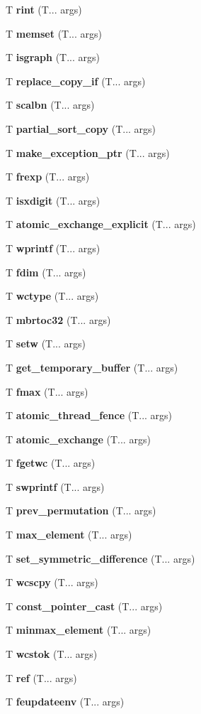 \begin{DoxyCompactItemize}
\item 
T \textbf{ rint} (T... args)
\item 
T \textbf{ memset} (T... args)
\item 
T \textbf{ isgraph} (T... args)
\item 
T \textbf{ replace\+\_\+copy\+\_\+if} (T... args)
\item 
T \textbf{ scalbn} (T... args)
\item 
T \textbf{ partial\+\_\+sort\+\_\+copy} (T... args)
\item 
T \textbf{ make\+\_\+exception\+\_\+ptr} (T... args)
\item 
T \textbf{ frexp} (T... args)
\item 
T \textbf{ isxdigit} (T... args)
\item 
T \textbf{ atomic\+\_\+exchange\+\_\+explicit} (T... args)
\item 
T \textbf{ wprintf} (T... args)
\item 
T \textbf{ fdim} (T... args)
\item 
T \textbf{ wctype} (T... args)
\item 
T \textbf{ mbrtoc32} (T... args)
\item 
T \textbf{ setw} (T... args)
\item 
T \textbf{ get\+\_\+temporary\+\_\+buffer} (T... args)
\item 
T \textbf{ fmax} (T... args)
\item 
T \textbf{ atomic\+\_\+thread\+\_\+fence} (T... args)
\item 
T \textbf{ atomic\+\_\+exchange} (T... args)
\item 
T \textbf{ fgetwc} (T... args)
\item 
T \textbf{ swprintf} (T... args)
\item 
T \textbf{ prev\+\_\+permutation} (T... args)
\item 
T \textbf{ max\+\_\+element} (T... args)
\item 
T \textbf{ set\+\_\+symmetric\+\_\+difference} (T... args)
\item 
T \textbf{ wcscpy} (T... args)
\item 
T \textbf{ const\+\_\+pointer\+\_\+cast} (T... args)
\item 
T \textbf{ minmax\+\_\+element} (T... args)
\item 
T \textbf{ wcstok} (T... args)
\item 
T \textbf{ ref} (T... args)
\item 
T \textbf{ feupdateenv} (T... args)
\item 

\end{DoxyCompactItemize}
